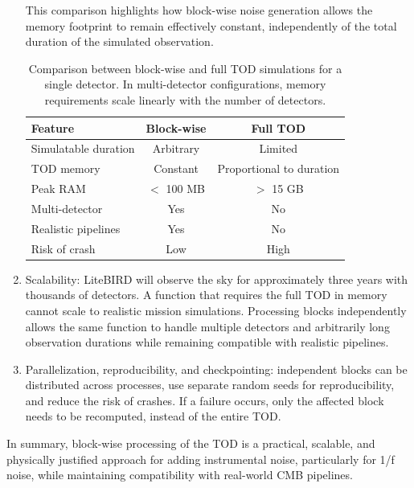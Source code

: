 \begin{enumerate}
    This comparison highlights how block-wise noise generation allows the memory footprint to remain effectively constant, independently of the total duration of the simulated observation.

    \begin{table}[h]
    \centering
    \begin{tabular}{lcc}
    \hline
    Feature & Block-wise & Full TOD \\
    \hline
    Simulatable duration & Arbitrary & Limited \\
    TOD memory & Constant & Proportional to duration \\
    Peak RAM & $<$ 100 MB & $>$ 15 GB \\
    Multi-detector & Yes & No \\
    Realistic pipelines & Yes & No \\
    Risk of crash & Low & High \\
    \hline
    \end{tabular}
    \caption{Comparison between block-wise and full TOD simulations for a single detector. In multi-detector configurations, memory requirements scale linearly with the number of detectors.}
    \end{table}

    \item Scalability:  
    LiteBIRD will observe the sky for approximately three years with thousands of detectors. A function that requires the full TOD in memory cannot scale to realistic mission simulations. Processing blocks independently allows the same function to handle multiple detectors and arbitrarily long observation durations while remaining compatible with realistic pipelines.

    \item Parallelization, reproducibility, and checkpointing: 
    independent blocks can be distributed across processes, use separate random seeds for reproducibility, and reduce the risk of crashes. If a failure occurs, only the affected block needs to be recomputed, instead of the entire TOD.
\end{enumerate}

In summary, block-wise processing of the TOD is a practical, scalable, and physically justified approach for adding instrumental noise, particularly for 1/f noise, while maintaining compatibility with real-world CMB pipelines.







